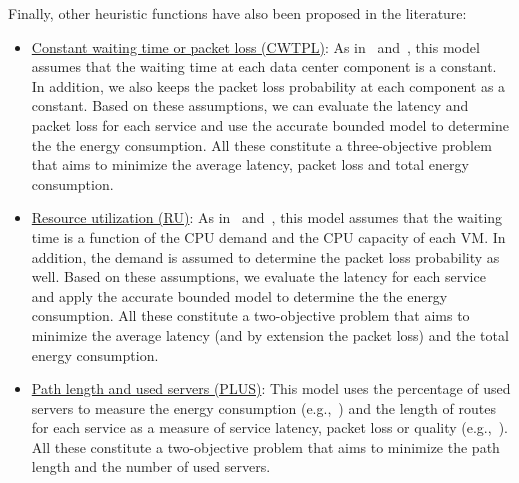 Finally, other heuristic functions have also been proposed in the literature:
\begin{itemize}
    \item\underline{Constant waiting time or packet loss (CWTPL)}: As in~\cite{VizarretaCMMK17} and~\cite{HawiloJS19}, this model assumes that the waiting time at each data center component is a constant. In addition, we also keeps the packet loss probability at each component as a constant. Based on these assumptions, we can evaluate the latency and packet loss for each service and use the accurate bounded model to determine the the energy consumption. All these constitute a three-objective problem that aims to minimize the average latency, packet loss and total energy consumption.

    \item\underline{Resource utilization (RU)}: As in~\cite{GuoWLQA0Y20} and~\cite{QiSW19}, this model assumes that the waiting time is a function of the CPU demand and the CPU capacity of each VM. In addition, the demand is assumed to determine the packet loss probability as well. Based on these assumptions, we evaluate the latency for each service and apply the accurate bounded model to determine the the energy consumption. All these constitute a two-objective problem that aims to minimize the average latency (and by extension the packet loss) and the total energy consumption.

    \item\underline{Path length and used servers (PLUS)}: This model uses the percentage of used servers to measure the energy consumption (e.g.,~\cite{MiottoLCG19,RankothgeLRL17,LiuZDLGZ18}) and the length of routes for each service as a measure of service latency, packet loss or quality (e.g.,~\cite{LuizelliCBG17,AllegKMA17}). All these constitute a two-objective problem that aims to minimize the path length and the number of used servers.
\end{itemize}
